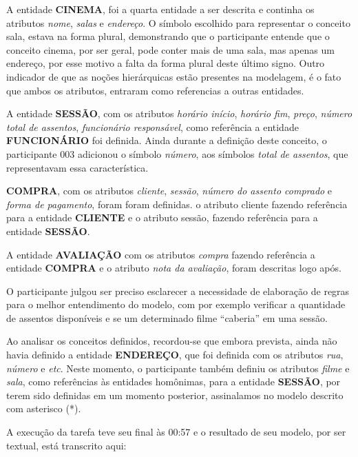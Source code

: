 A entidade \textbf{CINEMA}, foi a quarta entidade a ser descrita e continha os atributos \textit{nome}, \textit{salas} e \textit{endereço}. O símbolo escolhido para representar o conceito sala, estava na forma plural, demonstrando que o participante entende que o conceito cinema, por ser geral, pode conter mais de uma sala, mas apenas um endereço, por esse motivo a falta da forma plural deste último signo. Outro indicador de que as noções hierárquicas estão presentes na modelagem, é o fato que ambos os atributos, entraram como referencias a outras entidades.

A entidade \textbf{SESSÃO}, com os atributos \textit{horário início}, \textit{horário fim}, \textit{preço}, \textit{número total de assentos}, \textit{funcionário responsável}, como referência a entidade \textbf{FUNCIONÁRIO} foi definida. Ainda durante a definição deste conceito, o participante 003 adicionou o símbolo \textit{número}, aos símbolos \textit{total de assentos}, que representavam essa característica. 

\textbf{COMPRA}, com os atributos \textit{cliente}, \textit{sessão}, \textit{número do assento comprado} e \textit{forma de pagamento}, foram foram definidas. o atributo cliente fazendo referência para a entidade \textbf{CLIENTE} e o atributo sessão, fazendo referência para a entidade \textbf{SESSÃO}.

A entidade \textbf{AVALIAÇÃO} com os atributos \textit{compra} fazendo referência a entidade \textbf{COMPRA} e o atributo \textit{nota da avaliação}, foram descritas logo após.

O participante julgou ser preciso esclarecer a necessidade de elaboração de regras para o melhor entendimento do modelo, com por exemplo verificar a quantidade de assentos disponíveis e se um determinado filme ``caberia'' em uma sessão. 

Ao analisar os conceitos definidos, recordou-se que embora prevista, ainda não havia definido a entidade \textbf{ENDEREÇO}, que foi definida com os atributos \textit{rua}, \textit{número} e \textit{etc}. Neste momento, o participante também definiu os atributos \textit{filme} e \textit{sala}, como referências às entidades homônimas, para a entidade \textbf{SESSÃO}, por terem sido definidas em um momento posterior, assinalamos no modelo descrito com asterisco (*).

A execução da tarefa teve seu final às 00:57 e o resultado de seu modelo, por ser textual, está transcrito aqui:

